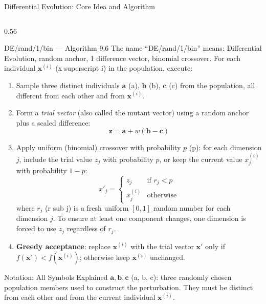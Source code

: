 \documentclass[aspectratio=169,10pt]{beamer}
\newcommand{\bx}{\mathbf{x}}
\newcommand{\ba}{\mathbf{a}}
\newcommand{\bb}{\mathbf{b}}
\newcommand{\bc}{\mathbf{c}}
\begin{document}
\begin{frame}[allowframebreaks]{Differential Evolution: Core Idea and Algorithm}
  \begin{columns}[T]
    \begin{column}{0.56\textwidth}
      \begin{block}{DE/rand/1/bin --- Algorithm 9.6}
        The name ``DE/rand/1/bin'' means: Differential Evolution,
        random anchor, 1 difference vector, binomial crossover.
        For each individual $\bx^{(i)}$ (x superscript i) in the
        population, execute:
        \begin{enumerate}
          \item Sample three distinct individuals
                $\ba$ (a), $\bb$ (b), $\bc$ (c) from the population,
                all different from each other and from $\bx^{(i)}$.
          \item Form a \emph{trial vector} (also called the mutant
                vector) using a random anchor plus a scaled difference:
                \[
                  \mathbf{z} = \ba + w(\bb - \bc)
                \]
          \item Apply uniform (binomial) crossover with probability
                $p$ (p): for each dimension $j$, include the trial
                value $z_j$ with probability $p$, or keep the current
                value $x^{(i)}_j$ with probability $1-p$:
                \[
                  x'_j =
                  \begin{cases}
                    z_j & \text{if } r_j < p \\
                    x^{(i)}_j & \text{otherwise}
                  \end{cases}
                \]
                where $r_j$ (r sub j) is a fresh uniform $[0,1]$
                random number for each dimension $j$.  To ensure
                at least one component changes, one dimension is
                forced to use $z_j$ regardless of $r_j$.
          \item \textbf{Greedy acceptance}: replace $\bx^{(i)}$
                with the trial vector $\bx'$ only if
                $f(\bx') < f(\bx^{(i)})$; otherwise keep
                $\bx^{(i)}$ unchanged.
        \end{enumerate}
      \end{block}

      \begin{block}{Notation: All Symbols Explained}
        $\ba, \bb, \bc$ (a, b, c): three randomly chosen population
        members used to construct the perturbation.  They must be
        distinct from each other and from the current individual
        $\bx^{(i)}$.


\end{block}
\end{column}
\end{columns}
\end{frame}
\end{document}
